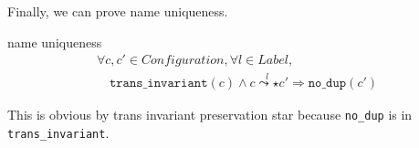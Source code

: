 Finally, we can prove name uniqueness.
\begin{theorem}{name uniqueness}
  \begin{displaymath}
    \begin{array}{l}
      \forall c, c' \in \textit{Configuration}, \forall l \in \textit{Label}, \\
      \quad \texttt{trans\_invariant}(c) \wedge c \overset{l}{\leadsto\star} c' \Rightarrow \texttt{no\_dup}(c')
    \end{array}
  \end{displaymath}
\end{theorem}
This is obvious by trans invariant preservation star because \texttt{no\_dup} is in \texttt{trans\_invariant}.
